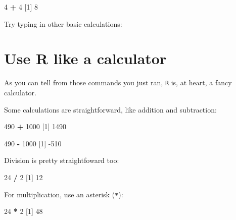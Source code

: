 \documentclass[
]{book}
\newenvironment{Shaded}{\begin{snugshade}}{\end{snugshade}}
\newcommand{\DecValTok}[1]{\textcolor[rgb]{0.00,0.00,0.81}{#1}}
\newcommand{\NormalTok}[1]{#1}
\newcommand{\OperatorTok}[1]{\textcolor[rgb]{0.81,0.36,0.00}{\textbf{#1}}}
\newcommand{\StringTok}[1]{\textcolor[rgb]{0.31,0.60,0.02}{#1}}
\begin{document}
\begin{Shaded}
\begin{Highlighting}[]
\DecValTok{4} \OperatorTok{+}\StringTok{ }\DecValTok{4}
\NormalTok{[}\DecValTok{1}\NormalTok{] }\DecValTok{8}
\end{Highlighting}
\end{Shaded}

Try typing in other basic calculations:

\hypertarget{use-r-like-a-calculator}{%
\section*{Use R like a calculator}\label{use-r-like-a-calculator}}

As you can tell from those commands you just ran, \texttt{R} is, at heart, a fancy calculator.

Some calculations are straightforward, like addition and subtraction:

\begin{Shaded}
\begin{Highlighting}[]
\DecValTok{490} \OperatorTok{+}\StringTok{ }\DecValTok{1000}
\NormalTok{[}\DecValTok{1}\NormalTok{] }\DecValTok{1490}
\end{Highlighting}
\end{Shaded}

\begin{Shaded}
\begin{Highlighting}[]
\DecValTok{490} \OperatorTok{-}\StringTok{ }\DecValTok{1000}
\NormalTok{[}\DecValTok{1}\NormalTok{] }\DecValTok{-510}
\end{Highlighting}
\end{Shaded}

Division is pretty straightfoward too:

\begin{Shaded}
\begin{Highlighting}[]
\DecValTok{24} \OperatorTok{/}\StringTok{ }\DecValTok{2}
\NormalTok{[}\DecValTok{1}\NormalTok{] }\DecValTok{12}
\end{Highlighting}
\end{Shaded}

For multiplication, use an asterisk (\texttt{*}):

\begin{Shaded}
\begin{Highlighting}[]
\DecValTok{24} \OperatorTok{*}\StringTok{ }\DecValTok{2}
\NormalTok{[}\DecValTok{1}\NormalTok{] }\DecValTok{48}
\end{Highlighting}
\end{Shaded}
\end{document}
